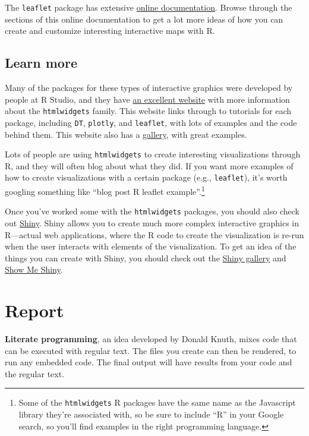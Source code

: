\documentclass[]{tufte-book}
\begin{document}
The \texttt{leaflet} package has extensive \href{https://rstudio.github.io/leaflet/}{online documentation}.
Browse through the sections of this online documentation to get a lot more ideas of how you can
create and customize interesting interactive maps with R.

\hypertarget{learn-more-2}{%
\section{Learn more}\label{learn-more-2}}

Many of the packages for these types of interactive graphics were developed by people
at R Studio, and they have \href{https://www.htmlwidgets.org/}{an excellent website}
with more information about the
\texttt{htmlwidgets} family. This website links through to tutorials for each package, including
\texttt{DT}, \texttt{plotly}, and \texttt{leaflet}, with lots of examples and the code behind them.
This website also has a \href{http://gallery.htmlwidgets.org/}{gallery}, with great examples.

Lots of people are using \texttt{htmlwidgets} to create interesting visualizations through R,
and they will often blog about what they did. If you want more examples of how to
create visualizations with a certain package (e.g., \texttt{leaflet}), it's worth googling
something like ``blog post R leaflet example''.\footnote{Some of the \texttt{htmlwidgets} R packages
  have the same name as the Javascript library they're associated with, so be sure to
  include ``R'' in your Google search, so you'll find examples in the right programming
  language.}

Once you've worked some with the \texttt{htmlwidgets} packages, you should also check out
\href{https://shiny.rstudio.com/}{Shiny}. Shiny allows you to create much more complex
interactive graphics in R---actual
web applications, where the R code to create the visualization is re-run when the user
interacts with elements of the visualization. To get an idea of the things you can
create with Shiny, you should check out the \href{https://shiny.rstudio.com/gallery/}{Shiny gallery}
and \href{https://www.showmeshiny.com/}{Show Me Shiny}.

\hypertarget{report}{%
\chapter{Report}\label{report}}

\textbf{Literate programming}, an idea developed by Donald Knuth, mixes code that can be executed with regular text. The files you create can then be rendered, to run any embedded code. The final output will have results from your code and the regular text.
\end{document}
